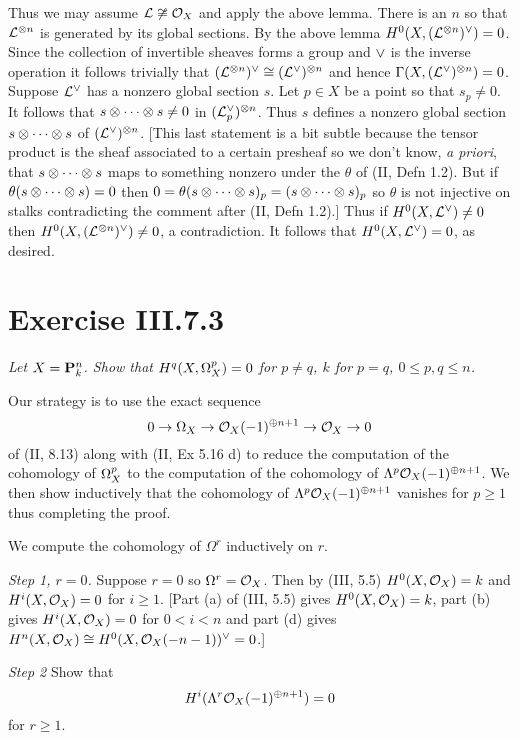 \documentclass[12pt]{article}
\begin{document}
Thus we may assume $\L\not\isom\sox$ and apply the above lemma. 
There is an $n$
so that $\L^{\tensor n}$ is generated by its global sections. By the
above lemma $H^0(X,(\L^{\tensor n})^{\dual})=0$. Since the collection
of invertible sheaves forms a group and $\dual$ is the inverse operation
it follows trivially that
$(\L^{\tensor n})^{\dual}\isom(\L^{\dual})^{\tensor n}$ and
hence $\Gamma(X,(\L^{\dual})^{\tensor n})=0$.
Suppose $\L^{\dual}$
has a nonzero global section $s$. Let $p\in X$ be a point so that 
$s_p\neq 0$. It follows that $s\tensor\cdots\tensor s\neq 0$ in 
$(\L^{\dual}_p)^{\tensor n}$. Thus $s$ defines a nonzero global section
$s\tensor\cdots\tensor s$ of $(\L^{\dual})^{\tensor n}$. [This last statement
is a bit subtle because the tensor product is the sheaf associated to
a certain presheaf so we don't know, {\em a priori}, that $s\tensor\cdots\tensor s$
maps to something nonzero under the $\theta$ of (II, Defn 1.2). But
if $\theta(s\tensor\cdots\tensor s)=0$ then $0=\theta(s\tensor\cdots\tensor s)_p=(s\tensor\cdots\tensor s)_p$
so $\theta$ is not injective on stalks contradicting the comment after
(II, Defn 1.2).] Thus if $H^0(X,\L^{\dual})\neq 0$ then 
$H^0(X,(\L^{\tensor n})^{\dual}) \neq 0$, a contradiction. It follows
that $H^0(X,\L^{\dual})=0$, as desired. 


\section{Exercise III.7.3}
{\em Let $X=\P^n_k$. Show that $H^q(X,\OX^p)=0$
for $p\neq q$, $k$ for $p=q$, $0\leq p,q\leq n$.}

Our strategy is to use the exact sequence 
$$0\into\OX\into\sox(-1)^{\oplus n+1}\into\sox\into 0$$
of (II, 8.13) along with (II, Ex 5.16 d) to reduce the 
computation of the cohomology of $\OX^p$ to the
computation of the cohomology of $\Lambda^p\sox(-1)^{\oplus n+1}$. 
We then show inductively 
that the cohomology of $\Lambda^p\sox(-1)^{\oplus n+1}$ vanishes for
$p\geq 1$ thus completing the proof. 

We compute the cohomology of $\Omega^r$ inductively on $r$. 

{\em Step 1, $r=0$.} Suppose $r=0$ so $\Omega^r=\sox$. Then
by (III, 5.5) $H^0(X,\sox)=k$ and $H^i(X,\sox)=0$ for $i\geq 1$.
[Part (a) of (III, 5.5) gives $H^0(X,\sox)=k$, part (b) gives
$H^i(X,\sox)=0$ for $0<i<n$ and part (d) gives 
$H^n(X,\sox)\isom H^0(X,\sox(-n-1))^{\dual}=0$.]

{\em Step 2} Show that
$$H^i(\Lambda^r\sox(-1)^{\oplus n+1})=0$$
for $r\geq 1$. 
\end{document}
